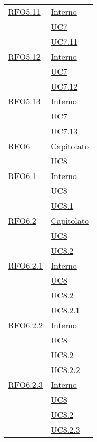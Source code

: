 \begin{longtable}{|>{\centering}m{5cm}|m{5cm}<{\centering}|}
 \hyperlink{RFD5.11}{RFO5.11} 
& \hyperlink{Interno}{Interno}\\
 & \hyperref[UC7]{UC7}\\
 & \hyperref[UC7.11]{UC7.11}\\\hline
 
\hyperlink{RFO5.12}{RFO5.12} 
& \hyperlink{Interno}{Interno}\\
 & \hyperref[UC7]{UC7}\\
 & \hyperref[UC7.12]{UC7.12}\\\hline
 
 \hyperlink{RFO5.13}{RFO5.13} 
& \hyperlink{Interno}{Interno}\\
 & \hyperref[UC7]{UC7}\\
 & \hyperref[UC7.13]{UC7.13}\\\hline 
 
 \hyperlink{RFO6}{RFO6} 
 & \hyperlink{Capitolato}{Capitolato}\\
 & \hyperref[UC8]{UC8}\\\hline
 
 \hyperlink{RFO6.1}{RFO6.1} 
 & \hyperlink{Interno}{Interno}\\
 & \hyperref[UC8]{UC8}\\
 & \hyperref[UC8.1]{UC8.1}\\\hline
 
 \hyperlink{RFO6.2}{RFO6.2} 
 & \hyperlink{Capitolato}{Capitolato}\\
 & \hyperref[UC8]{UC8}\\
 & \hyperref[UC8.2]{UC8.2}\\\hline
 
 \hyperlink{RFO6.2.1}{RFO6.2.1} 
 & \hyperlink{Interno}{Interno}\\
 & \hyperref[UC8]{UC8}\\
 & \hyperref[UC8.2]{UC8.2}\\
  & \hyperref[UC8.2.1]{UC8.2.1}\\\hline
  
   \hyperlink{RFO6.2.2}{RFO6.2.2} 
   & \hyperlink{Interno}{Interno}\\
  & \hyperref[UC8]{UC8}\\
  & \hyperref[UC8.2]{UC8.2}\\
  & \hyperref[UC8.2.2]{UC8.2.2}\\\hline
  
   \hyperlink{RFO6.2.3}{RFO6.2.3} 
   & \hyperlink{Interno}{Interno}\\
  & \hyperref[UC8]{UC8}\\
  & \hyperref[UC8.2]{UC8.2}\\
  & \hyperref[UC8.2.3]{UC8.2.3}\\\hline
  

\end{longtable}
